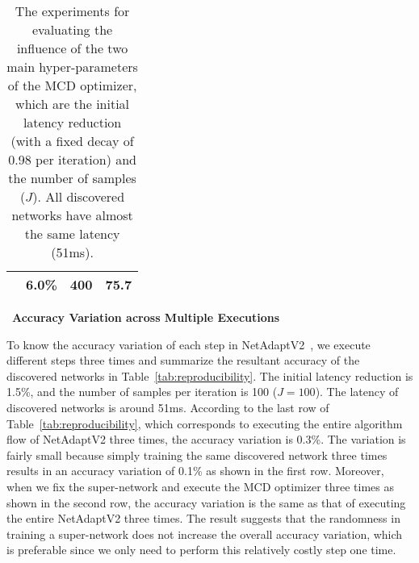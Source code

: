 \begin{table}[t]
{\begin{tabular}{c||c|c|c}
                                                                                             & 6.0\%                                                               & 400                                                                      & 75.7   \\ \toprule
\end{tabular}
}
\caption{The experiments for evaluating the influence of the two main hyper-parameters of the MCD optimizer, which are the initial latency reduction (with a fixed decay of 0.98 per iteration) and the number of samples ($J$). All discovered networks have almost the same latency (51ms).}
\label{tab:influence_latency_reduction}
\end{table}

\noindent \textbullet\ \textbf{Accuracy Variation across Multiple Executions}

To know the accuracy variation of each step in NetAdaptV2~\cite{li2020reproducibility}, we execute different steps three times and summarize the resultant accuracy of the discovered networks in Table~\ref{tab:reproducibility}. The initial latency reduction is 1.5\%, and the number of samples per iteration is 100 ($J=100$). The latency of discovered networks is around 51ms. According to the last row of Table~\ref{tab:reproducibility}, which corresponds to executing the entire algorithm flow of NetAdaptV2 three times, the accuracy variation is 0.3\%. The variation is fairly small because simply training the same discovered network three times results in an accuracy variation of 0.1\% as shown in the first row. Moreover, when we fix the super-network and execute the MCD optimizer three times as shown in the second row, the accuracy variation is the same as that of executing the entire NetAdaptV2 three times. The result suggests that the randomness in training a super-network does not increase the overall accuracy variation, which is preferable since we only need to perform this relatively costly step one time.

